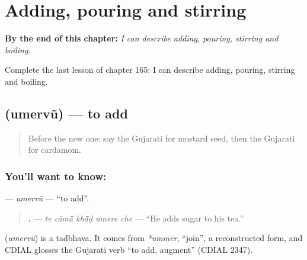 
\chapter{Adding, pouring and stirring}
\label{ch:gu-adding-pouring-and-stirring}

\begin{chapteropening}
\textbf{By the end of this chapter:} \emph{I can describe adding, pouring, stirring and boiling.}

Complete the last lesson of chapter 165: I can describe adding, pouring, stirring and boiling.
\end{chapteropening}

\section[\texorpdfstring{\gu{ઉમેરવું} (umervũ)}{ઉમેરવું (umervũ)}]{ (umervũ) — to add}

\label{lesson:GU-C165-umervu}



\begin{quote}
Before the new one: say the Gujarati for mustard seed, then the Gujarati for cardamom.
\end{quote}

\subsection*{You'll want to know: }
\textbf{} — \emph{umervũ} — \textquotedblleft{}to add\textquotedblright{}.

\begin{quote}
\textbf{    .} — \emph{te cāmā̃ khā̃ḍ umere che} — \textquotedblleft{}He adds sugar to his tea.\textquotedblright{}
\end{quote}

\begin{cousinweb}
\textbf{} (\emph{umervũ}) is a tadbhava. It comes from \emph{*ummēr}, \textquotedblleft{}join\textquotedblright{}, a reconstructed form, and CDIAL glosses the Gujarati verb \textquotedblleft{}to add, augment\textquotedblright{} (CDIAL 2347).
\end{cousinweb}


